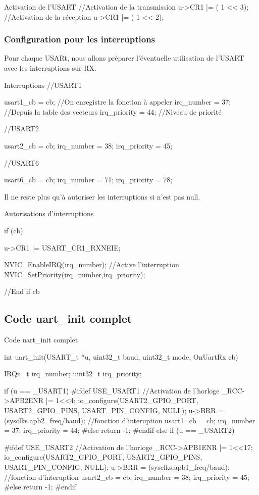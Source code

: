 {\begin{Cpp}{Activation de l'USART}
//Activation de la transmission 
u->CR1 |=	( 1 << 3);
//Activation de la réception
u->CR1 |=	( 1 << 2);
\end{Cpp}


\subsubsection{Configuration pour les interruptions}

Pour chaque USARt, nous allons préparer l'éventuelle utilisation de l'USART avec les interruptions sur RX.

\begin{Cpp}{Interruptions}
//USART1

usart1_cb = cb;     //On enregistre la fonction à appeler
irq_number = 37;    //Depuis la table des vecteurs
irq_priority = 44;  //Niveau de priorité

//USART2

usart2_cb = cb;
irq_number = 38;
irq_priority = 45;

//USART6

usart6_cb = cb;
irq_number = 71;
irq_priority = 78;

\end{Cpp}


Il ne reste plus qu'à autoriser les interruptions si  n'est pas null.

\begin{Cpp}{Autorisations d'interruptions}

if (cb) {
			
	u->CR1 |= USART_CR1_RXNEIE;

	NVIC_EnableIRQ(irq_number); //Active l'interruption
	NVIC_SetPriority(irq_number,irq_priority);
}//End if cb

\end{Cpp}

\subsection{Code uart\_init complet}

\begin{Cpp}{Code uart\_init complet}

int uart_init(USART_t *u, uint32_t baud, uint32_t mode, OnUartRx cb)
{
	IRQn_t	irq_number;
	uint32_t irq_priority;

	if (u == _USART1) {
#ifdef USE_USART1
		//Activation de l'horloge
		_RCC->APB2ENR |= 1<<4;
		io_configure(USART2_GPIO_PORT, USART2_GPIO_PINS, USART_PIN_CONFIG, NULL);
		u->BRR = (sysclks.apb2_freq/baud);
		//fonction d'interuption
		usart1_cb = cb;
		irq_number = 37;
		irq_priority = 44;
#else
	return -1;
#endif
	 } 
	 else if (u == _USART2) {
#ifdef USE_USART2
		//Activation de l'horloge
		_RCC->APB1ENR |= 1<<17;
		io_configure(USART2_GPIO_PORT, USART2_GPIO_PINS, USART_PIN_CONFIG, NULL);
		u->BRR = (sysclks.apb1_freq/baud);
		//fonction d'interuption
		usart2_cb = cb;
		irq_number = 38;
		irq_priority = 45;
#else
	return -1;
#endif

}}
\end{Cpp}}
